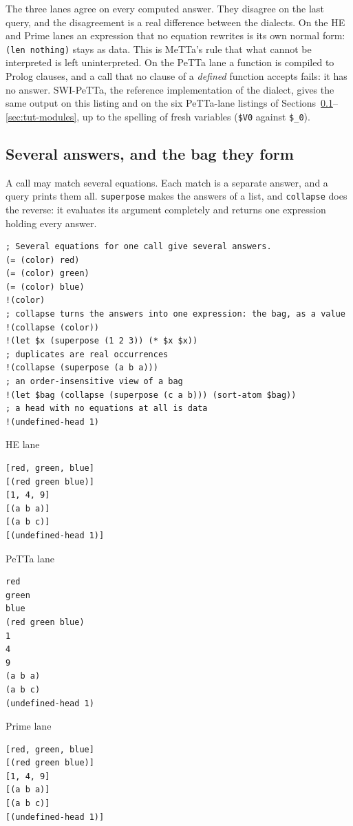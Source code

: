 \documentclass[11pt]{article}
\newcommand{\code}[1]{\texttt{#1}}
\newcommand{\outhead}[1]{{\footnotesize\sffamily #1}\par\vspace{1pt}}
\newcommand{\PeTTa}{\textup{PeTTa}}
\newcommand{\HE}{\textup{HE}}
\begin{document}
\noindent
The three lanes agree on every computed answer.  They disagree on the last
query, and the disagreement is a real difference between the dialects.  On the
\HE{} and Prime lanes an expression that no equation rewrites is its own
normal form: \code{(len nothing)} stays as data.  This is MeTTa's rule that
what cannot be interpreted is left uninterpreted.  On the \PeTTa{} lane a
function is compiled to Prolog clauses, and a call that no clause of a
\emph{defined} function accepts fails: it has no answer.  SWI-\PeTTa{}, the
reference implementation of the dialect, gives the same output on this
listing and on the six \PeTTa{}-lane listings of
Sections~\ref{sec:tut-nondet}--\ref{sec:tut-modules}, up to the spelling of
fresh variables (\code{\$V0} against \code{\$\_0}).

\subsection{Several answers, and the bag they form}
\label{sec:tut-nondet}

A call may match several equations.  Each match is a separate answer, and a
query prints them all.  \code{superpose} makes the answers of a list, and
\code{collapse} does the reverse: it evaluates its argument completely and
returns one expression holding every answer.

\begin{lstlisting}[style=metta,caption={Several answers, and the bag they form},label={lst:t02}]
; Several equations for one call give several answers.
(= (color) red)
(= (color) green)
(= (color) blue)
!(color)
; collapse turns the answers into one expression: the bag, as a value
!(collapse (color))
!(let $x (superpose (1 2 3)) (* $x $x))
; duplicates are real occurrences
!(collapse (superpose (a b a)))
; an order-insensitive view of a bag
!(let $bag (collapse (superpose (c a b))) (sort-atom $bag))
; a head with no equations at all is data
!(undefined-head 1)
\end{lstlisting}
\noindent\begin{minipage}[t]{0.32\textwidth}
\outhead{HE lane}
\begin{lstlisting}[style=out]
[red, green, blue]
[(red green blue)]
[1, 4, 9]
[(a b a)]
[(a b c)]
[(undefined-head 1)]
\end{lstlisting}
\end{minipage}\hfill
\begin{minipage}[t]{0.32\textwidth}
\outhead{PeTTa lane}
\begin{lstlisting}[style=out]
red
green
blue
(red green blue)
1
4
9
(a b a)
(a b c)
(undefined-head 1)
\end{lstlisting}
\end{minipage}\hfill
\begin{minipage}[t]{0.32\textwidth}
\outhead{Prime lane}
\begin{lstlisting}[style=out]
[red, green, blue]
[(red green blue)]
[1, 4, 9]
[(a b a)]
[(a b c)]
[(undefined-head 1)]
\end{lstlisting}
\end{minipage}
\end{document}

